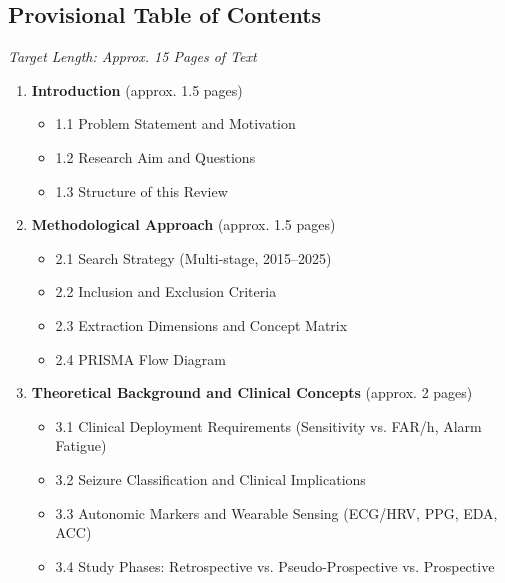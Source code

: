 \subsection{Provisional Table of Contents}
\textit{Target Length: Approx. 15 Pages of Text}

\begin{enumerate}
  \item \textbf{Introduction} (approx. 1.5 pages)
    \begin{itemize}
      \item 1.1 Problem Statement and Motivation
      \item 1.2 Research Aim and Questions
      \item 1.3 Structure of this Review
    \end{itemize}
    
  \item \textbf{Methodological Approach} (approx. 1.5 pages)
    \begin{itemize}
      \item 2.1 Search Strategy (Multi-stage, 2015--2025)
      \item 2.2 Inclusion and Exclusion Criteria
      \item 2.3 Extraction Dimensions and Concept Matrix
      \item 2.4 PRISMA Flow Diagram
    \end{itemize}
    
  \item \textbf{Theoretical Background and Clinical Concepts} (approx. 2 pages)
    \begin{itemize}
      \item 3.1 Clinical Deployment Requirements (Sensitivity vs. FAR/h, Alarm Fatigue)
      \item 3.2 Seizure Classification and Clinical Implications
      \item 3.3 Autonomic Markers and Wearable Sensing (ECG/HRV, PPG, EDA, ACC)
      \item 3.4 Study Phases: Retrospective vs. Pseudo-Prospective vs. Prospective
    \end{itemize}
    

\end{enumerate}
